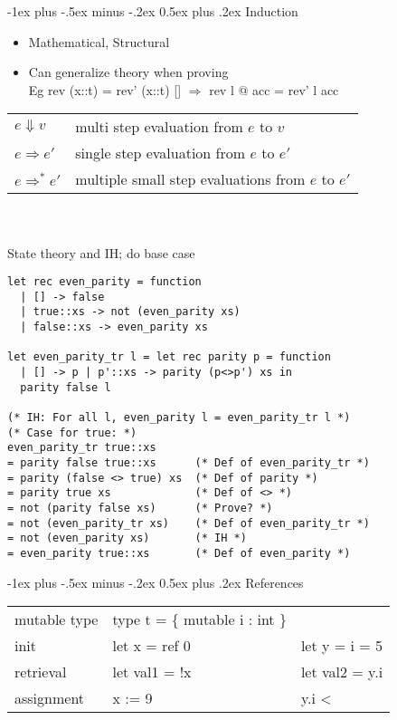 \documentclass[12pt]{article}
\makeatletter
\renewcommand{\section}{\@startsection{section}{1}{0mm}%
                                    {-1ex plus -.5ex minus -.2ex}%
                                    {0.5ex plus .2ex}%
                                    {\normalfont\large\bfseries\color{header}}}
\makeatother
\begin{document}
\begin{multicols}{2}
    \section{Induction}
    
    \begin{itemize}[noitemsep,nosep]
        \item Mathematical, Structural
        \item Can generalize theory when proving \\
        Eg rev (x::t) = rev' (x::t) [] $\Rightarrow$ rev l @ acc = rev' l acc
    \end{itemize} 
    \vspace{1mm}
	\begin{tabular}{l l}
	$e \Downarrow v$ 		& multi step evaluation from $e$ to $v$ 			\\
	$e \Rightarrow e'$ 		& single step evaluation from $e$ to $e'$ 			\\
	$e \Rightarrow^* e'$	& multiple small step evaluations from $e$ to $e'$ 	\\
    \end{tabular} \\~\\
    State theory and IH; do base case \\
    \begin{lstlisting}
let rec even_parity = function
  | [] -> false
  | true::xs -> not (even_parity xs)
  | false::xs -> even_parity xs

let even_parity_tr l = let rec parity p = function
  | [] -> p | p'::xs -> parity (p<>p') xs in
  parity false l

(* IH: For all l, even_parity l = even_parity_tr l *)   
(* Case for true: *)
even_parity_tr true::xs
= parity false true::xs      (* Def of even_parity_tr *)
= parity (false <> true) xs  (* Def of parity *)
= parity true xs             (* Def of <> *)
= not (parity false xs)      (* Prove? *)
= not (even_parity_tr xs)    (* Def of even_parity_tr *)
= not (even_parity xs)       (* IH *)
= even_parity true::xs       (* Def of even_parity *)

    \end{lstlisting}

    \section{References}
    \begin{tabular}{l l l}
        mutable type    & type t = \{ mutable i : int \} \\
        init        & let x = ref 0 & let y = { i = 5 } \\
        retrieval   & let val1 = !x & let val2 = y.i \\
        assignment  & x := 9    & y.i \textless \textendash 1

    \end{tabular}
	
\end{multicols}
\end{document}
